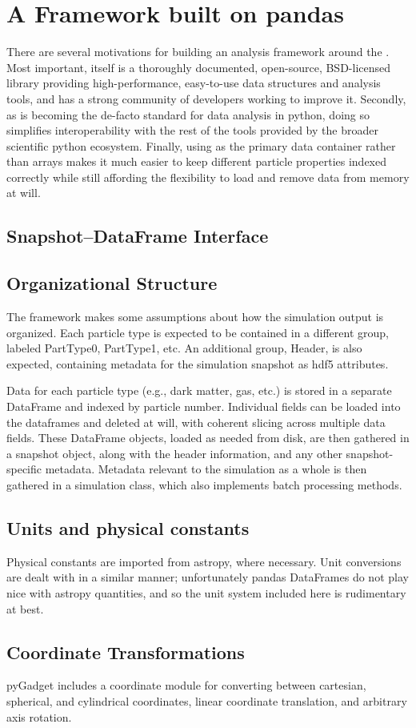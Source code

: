 \section{A Framework built on pandas}
\label{framework}

There are several motivations for building an analysis framework around the . 
Most important,  itself is a thoroughly documented, open-source, BSD-licensed library providing high-performance, easy-to-use data structures and analysis tools, and has a strong community of developers working to improve it.  
Secondly, as  is becoming the de-facto standard for data analysis in python, doing so simplifies interoperability with the rest of the tools provided by the broader scientific python ecosystem.
Finally, using  as the primary data container rather than  arrays makes it much easier to keep different particle properties indexed correctly while still affording the flexibility to load and remove data from memory at will.

\subsection{Snapshot--DataFrame Interface}

\subsection{Organizational Structure}
\label{hierarchy}
The framework makes some assumptions about how the simulation output is organized.  Each particle type is expected to be contained in a different group, labeled PartType0, PartType1, etc. An additional group, Header, is also expected, containing metadata for the simulation snapshot as hdf5 attributes.  

Data for each particle type (e.g., dark matter, gas, etc.) is stored in a separate DataFrame and indexed by particle number.  Individual fields can be loaded into the dataframes and deleted at will, with coherent slicing across multiple data fields.   These DataFrame objects, loaded as needed from disk, are then gathered in a snapshot object, along with the header information, and any other snapshot-specific metadata.  Metadata relevant to the simulation as a whole is then gathered in a simulation class, which also implements batch processing methods.

\subsection{Units and physical constants}
\label{units}
Physical constants are imported from astropy, where necessary.  Unit conversions are dealt with in a similar manner; unfortunately pandas DataFrames do not play nice with astropy quantities, and so the unit system included here is rudimentary at best.

\subsection{Coordinate Transformations}
\label{coordinates}
pyGadget includes a coordinate module for converting between cartesian, spherical, and cylindrical coordinates, linear coordinate translation, and arbitrary axis rotation.